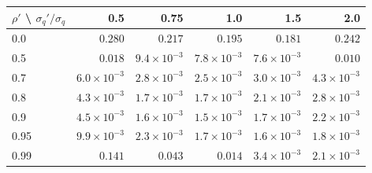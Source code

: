 \begin{tabular}{lrrrrr}
\toprule
$\rho'$ \textbackslash{} $\sigma_q'/\sigma_q$ & 0.5 & 0.75 & 1.0 & 1.5 & 2.0 \\
\midrule
0.0 & $0.280$ & $0.217$ & $0.195$ & $0.181$ & $0.242$ \\
0.5 & $0.018$ & $9.4\!\times\!10^{-3}$ & $7.8\!\times\!10^{-3}$ & $7.6\!\times\!10^{-3}$ & $0.010$ \\
0.7 & $6.0\!\times\!10^{-3}$ & $2.8\!\times\!10^{-3}$ & $2.5\!\times\!10^{-3}$ & $3.0\!\times\!10^{-3}$ & $4.3\!\times\!10^{-3}$ \\
0.8 & $4.3\!\times\!10^{-3}$ & $1.7\!\times\!10^{-3}$ & $1.7\!\times\!10^{-3}$ & $2.1\!\times\!10^{-3}$ & $2.8\!\times\!10^{-3}$ \\
0.9 & $4.5\!\times\!10^{-3}$ & $1.6\!\times\!10^{-3}$ & \textbf{$1.5\!\times\!10^{-3}$} & $1.7\!\times\!10^{-3}$ & $2.2\!\times\!10^{-3}$ \\
0.95 & $9.9\!\times\!10^{-3}$ & $2.3\!\times\!10^{-3}$ & $1.7\!\times\!10^{-3}$ & $1.6\!\times\!10^{-3}$ & $1.8\!\times\!10^{-3}$ \\
0.99 & $0.141$ & $0.043$ & $0.014$ & $3.4\!\times\!10^{-3}$ & $2.1\!\times\!10^{-3}$ \\
\bottomrule
\end{tabular}